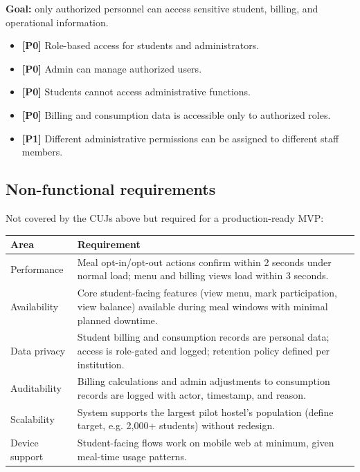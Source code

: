 \documentclass[12pt,a4paper]{article}
\newcommand{\priority}[1]{\textbf{[#1]}}
\begin{document}
\textbf{Goal:} only authorized personnel can access sensitive student, billing,
and operational information.

\begin{itemize}
    \item \priority{P0} Role-based access for students and administrators.
    \item \priority{P0} Admin can manage authorized users.
    \item \priority{P0} Students cannot access administrative functions.
    \item \priority{P0} Billing and consumption data is accessible only to
          authorized roles.
    \item \priority{P1} Different administrative permissions can be assigned to
          different staff members.
\end{itemize}

\subsection{Non-functional requirements}

Not covered by the CUJs above but required for a production-ready MVP:

\begin{center}
\small
\begin{tabularx}{0.99\textwidth}{L{0.22\textwidth} Y}
\toprule
\textbf{Area} & \textbf{Requirement}\\
\midrule
Performance &
Meal opt-in/opt-out actions confirm within 2 seconds under normal load;
menu and billing views load within 3 seconds.\\
Availability &
Core student-facing features (view menu, mark participation, view balance)
available during meal windows with minimal planned downtime.\\
Data privacy &
Student billing and consumption records are personal data; access is role-gated
and logged; retention policy defined per institution.\\
Auditability &
Billing calculations and admin adjustments to consumption records are logged
with actor, timestamp, and reason.\\
Scalability &
System supports the largest pilot hostel's population (define target, e.g.
2,000+ students) without redesign.\\
Device support &
Student-facing flows work on mobile web at minimum, given meal-time usage
patterns.\\
\bottomrule
\end{tabularx}
\end{center}
\end{document}
